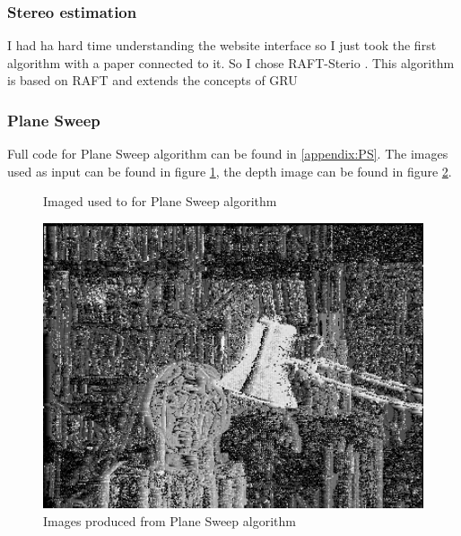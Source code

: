 \documentclass{article}
\begin{document}
    \subsubsection{Stereo estimation}
    I had ha hard time understanding the website interface so I just took the first
    algorithm with a paper connected to it. So I chose RAFT-Sterio \cite{lipson2021raft}.
    This algorithm is based on RAFT \cite{teed2020raft} and extends the concepts of GRU
    \subsubsection{Plane Sweep}
    Full code for Plane Sweep algorithm can be found in \ref{appendix:PS}. The images used as input can be found in figure \ref{fig:psOrigi},
    the depth image can be found in figure \ref{fig:ps}.
    \begin{figure}[H]
        \centering
        \quad
        \caption{Imaged used to for Plane Sweep algorithm}
        \label{fig:psOrigi}
    \end{figure}
    \begin{figure}[H]
        \includegraphics[width=1\textwidth]{sd.png}
        \caption{Images produced from Plane Sweep algorithm}
        \label{fig:ps}
    \end{figure}
\end{document}
